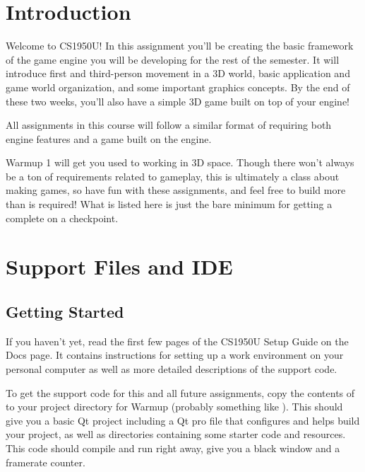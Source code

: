 \documentclass{../cs195u}
\begin{document}
 \section*{Introduction}

Welcome to CS1950U! In this assignment you’ll be creating the basic framework of the game
engine you will be developing for the rest of the semester. It will introduce first and third-person
movement in a 3D world, basic application and game world organization, and some important
graphics concepts. By the end of these two weeks, you’ll also have a simple 3D game built on top
of your engine!

All assignments in this course will follow a similar format of requiring both engine features and a
game built on the engine.

  Warmup 1 will get you used to working in 3D space. Though there won't always be a ton of requirements related to gameplay, this is ultimately a class about making games, so have fun with these assignments, and feel free to build more than is required! What is listed here is just the bare minimum for getting a complete on a checkpoint.





 \section*{Support Files and IDE}
  \subsection*{Getting Started}
 If you haven’t yet, read the first few pages of the CS1950U Setup Guide on the Docs
page. It contains instructions for setting up a work environment on your personal computer as well
as more detailed descriptions of the support code.
  
To get the support code for this and all future assignments, copy the contents of  to your project directory for Warmup (probably something like ). This should give you a basic Qt project including a Qt pro file that configures and helps build your project, as well as directories containing some starter code and resources. This code should compile and run right away, give you a black window and a framerate counter.
\end{document}
